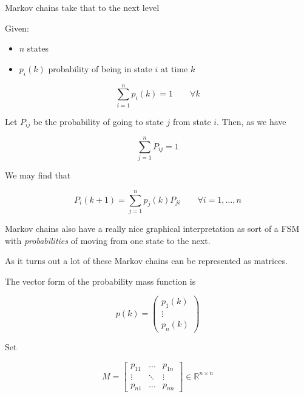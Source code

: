 \documentclass[10pt]{article}
\begin{document}
Markov chains take that to the next level

Given:
\begin{itemize}
	\item $ n $ states
	\item $ p_i(k) $  probability of being in state $ i $ at time $ k $ 
\end{itemize}

\begin{equation}
	\sum_{i=1}^n p_i(k) = 1 \qquad \forall k
\end{equation}

Let $ P_{ij} $ be the probability of going to state $ j $ from state $ i $. Then, as we have

\begin{equation}
	\sum^n_{j=1} P_{ij} = 1
\end{equation}

We may find that 

\begin{equation}
	P_i(k+1)=  \sum^n_{j=1} p_j (k) P_{ji} \qquad \forall i = 1, \ldots, n
		\label{eq:286:markov_chain}
\end{equation}



Markov chains also have a really nice graphical interpretation as sort of a FSM with \textit{probabilities} of moving from one state to the next.



As it turns out a lot of these Markov chains can be represented as matrices.


The vector form of the probability mass function is

\begin{equation}
	p(k) = \begin{pmatrix} p_{1}(k) \\ \vdots\\ p_{n}(k) \end{pmatrix}
\end{equation}


Set 

\begin{equation}
	M = 
	\begin{bmatrix}
		p_{11} & \ldots & p_{1n} \\
			\vdots & \ddots & \vdots \\
		p_{n1} & \ldots & p_{nn}
	\end{bmatrix}
	\in \mathbb{R}^{n \times n}
\end{equation}
\end{document}
